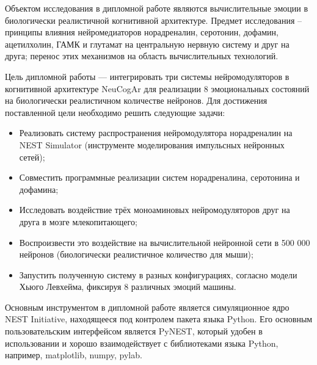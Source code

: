 Объектом исследования в дипломной работе являются вычислительные эмоции в биологически реалистичной когнитивной архитектуре. Предмет исследования – принципы влияния нейромедиаторов норадреналин, серотонин, дофамин, ацетилхолин, ГАМК и глутамат на центральную нервную систему и друг на друга; перенос этих механизмов на область вычислительных технологий.

Цель дипломной работы — интегрировать три системы нейромодуляторов в когнитивной архитектуре NeuCogAr для реализации 8 эмоциональных состояний на биологически реалистичном количестве нейронов. Для достижения поставленной цели необходимо решить следующие задачи:
\begin{itemize}
\item Реализовать систему распространения нейромодулятора норадреналин на NEST Simulator (инструменте моделирования импульсных нейронных сетей);
\item Совместить программные реализации систем норадреналина, серотонина и дофамина;
\item Исследовать воздействие трёх моноаминовых нейромодуляторов друг на друга в мозге млекопитающего;
\item Воспроизвести это воздействие на вычислительной нейронной сети в 500 000 нейронов (биологически реалистичное количество для мыши);
\item Запустить полученную систему в разных конфигурациях, согласно модели Хьюго Левхейма, фиксируя 8 различных эмоций машины.
\end{itemize}

Основным инструментом в дипломной работе является симуляционное ядро NEST Initiative, находящееся под контролем пакета языка Python. Его основным пользовательским интерфейсом является PyNEST, который удобен в использовании и хорошо взаимодействует с библиотеками языка Python, например, matplotlib, numpy, pylab.